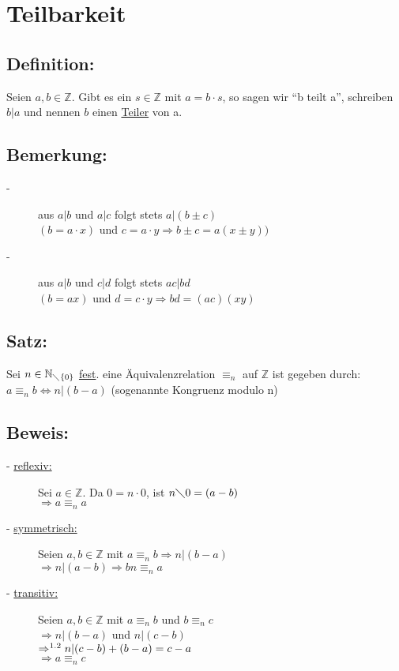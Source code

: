 \section{Teilbarkeit}

\subsection{Definition:}
Seien $a,b \in \mathbb{Z}$. Gibt es ein $s \in \mathbb{Z}$ mit $a = b\cdot s$, so sagen wir "`b teilt a"', schreiben $b|a$ und nennen $b$ einen \underline{Teiler} von a. 
%
%
%
\subsection{Bemerkung:}
\begin{description}
	\item[-] aus $a|b$ und $a|c$ folgt stets $a|(b\pm c)$ \\
		$(b=a\cdot x)$ und $c =a\cdot y \Rightarrow b\pm c = a(x\pm y))$

	\item[-] aus $a|b$ und $c|d$ folgt stets $ac|bd$ \\
		$(b=ax)$ und $d =c\cdot y \Rightarrow bd = (ac)(xy)$
\end{description}
%
%
%
\subsection{Satz:}
Sei $n \in \mathbb{N}_{\diagdown\{0\}}$ \underline{fest}. eine Äquivalenzrelation $\equiv_{n}$ auf $\mathbb{Z}$ ist gegeben durch: $ a \equiv_{n} b \Leftrightarrow n|(b-a)$ (sogenannte Kongruenz modulo n)
%
%
%
\subsection{Beweis:}
\begin{description}
	\item[- \underline{reflexiv:}] Sei $ a \in \mathbb{Z}$. Da $ 0 = n\cdot  0$, ist $n \diagdown 0 = (a-b)$\\
						 $\Rightarrow a \equiv_{n} 
					  a$
	\item[- \underline{symmetrisch:}] Seien $a,b \in \mathbb{Z}$ mit $a \equiv_{n} b \Rightarrow n|(b-a)$\\
						$\Rightarrow n|(a-b) \Rightarrow bn\equiv_{n} a$
	
	\item[- \underline{transitiv:}] Seien $a,b \in \mathbb{Z}$ mit $a\equiv_{n} b$ und $b\equiv_{n} c$ \\
						$\Rightarrow n|(b-a)$ und $n|(c-b)$ \\
						$\Rightarrow^{\small{1.2}} n|(c-b) + (b-a) = c-a$\\
						$\Rightarrow a \equiv_{n} c$
\end{description}
%
%
%
